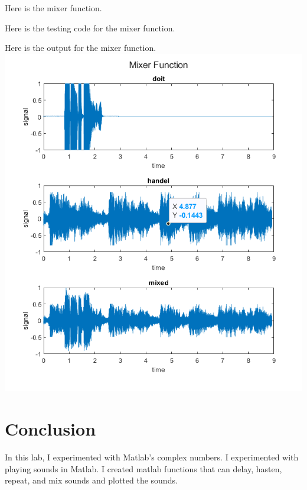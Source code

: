 \documentclass[11pt]{article}
\begin{document}
Here is the mixer function.\\



\vspace{10pt}

Here is the testing code for the mixer function.\\



\vspace{10pt}

Here is the output for the mixer function.\\

\includegraphics[width=\textwidth]{mixer.png}

\section{Conclusion}

In this lab, I experimented with Matlab's complex numbers. I experimented with playing sounds in Matlab. I created matlab functions that can delay, hasten, repeat, and mix sounds and plotted the sounds.
\end{document}
